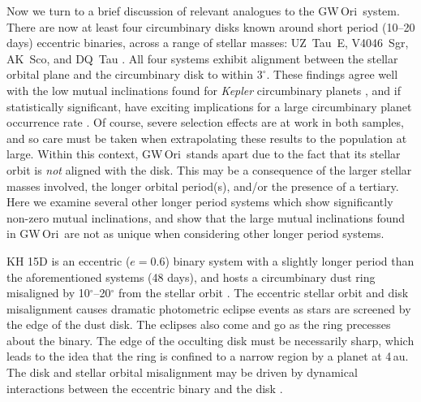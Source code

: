 \documentclass[twocolumn]{aastex61}
\newcommand{\obj}{GW\,Ori}
\begin{document}
Now we turn to a brief discussion of relevant analogues to the \obj\ system. %
There are now at least four circumbinary disks known around short period (10--20 days) eccentric binaries, across a range of stellar masses: UZ~Tau~E, V4046~Sgr, AK~Sco, and DQ~Tau \citep{jensen07,rosenfeld12b,czekala15b,czekala16}. All four systems exhibit alignment between the stellar orbital plane and the circumbinary disk to within $3^\circ$. These findings agree well with the low mutual inclinations found for \emph{Kepler} circumbinary planets \citep{winn15}, and if statistically significant, have exciting implications for a large circumbinary planet occurrence rate \citep{li16}. Of course, severe selection effects are at work in both samples, and so care must be taken when extrapolating these results to the population at large. Within this context, \obj\ stands apart due to the fact that its stellar orbit is \emph{not} aligned with the disk. This may be a consequence of the larger stellar masses involved, the longer orbital period(s), and/or the presence of a tertiary. Here we examine several other longer period systems which show significantly non-zero mutual inclinations, and show that the large mutual inclinations found in \obj\ are not as unique when considering other longer period systems.

KH 15D is an eccentric ($e=0.6$) binary system with a slightly longer period than the aforementioned systems (48 days), and hosts a circumbinary dust ring misaligned by 10$^\circ$--20$^\circ$ from the stellar orbit \citep{chiang04,capelo12}. The eccentric stellar orbit and disk misalignment causes dramatic photometric eclipse events as stars are screened by the edge of the dust disk. The eclipses also come and go as the ring precesses about the binary. The edge of the occulting disk must be necessarily sharp, which leads to the idea that the ring is confined to a narrow region by a planet at 4\,au. The disk and stellar orbital misalignment may be driven by dynamical interactions between the eccentric binary and the disk \citep[e.g.,][]{martin17,zanazzi17}.
\end{document}
